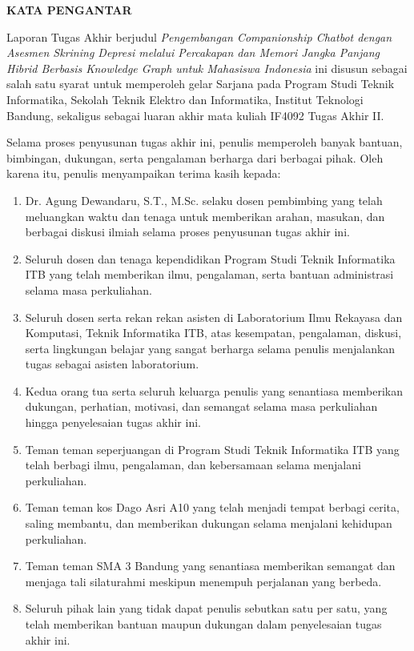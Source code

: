 \begin{center}
{\bfseries\large KATA PENGANTAR}
\end{center}

\vspace{0.5cm}

Laporan Tugas Akhir berjudul \textit{Pengembangan Companionship Chatbot dengan Asesmen Skrining Depresi melalui Percakapan dan Memori Jangka Panjang Hibrid Berbasis Knowledge Graph untuk Mahasiswa Indonesia} ini disusun sebagai salah satu syarat untuk memperoleh gelar Sarjana pada Program Studi Teknik Informatika, Sekolah Teknik Elektro dan Informatika, Institut Teknologi Bandung, sekaligus sebagai luaran akhir mata kuliah IF4092 Tugas Akhir II.

Selama proses penyusunan tugas akhir ini, penulis memperoleh banyak bantuan, bimbingan, dukungan, serta pengalaman berharga dari berbagai pihak. Oleh karena itu, penulis menyampaikan terima kasih kepada:

\begin{enumerate}[label=\arabic*.,leftmargin=*]

\item Dr. Agung Dewandaru, S.T., M.Sc. selaku dosen pembimbing yang telah meluangkan waktu dan tenaga untuk memberikan arahan, masukan, dan berbagai diskusi ilmiah selama proses penyusunan tugas akhir ini.

\item Seluruh dosen dan tenaga kependidikan Program Studi Teknik Informatika ITB yang telah memberikan ilmu, pengalaman, serta bantuan administrasi selama masa perkuliahan.

\item Seluruh dosen serta rekan rekan asisten di Laboratorium Ilmu Rekayasa dan Komputasi, Teknik Informatika ITB, atas kesempatan, pengalaman, diskusi, serta lingkungan belajar yang sangat berharga selama penulis menjalankan tugas sebagai asisten laboratorium.

\item Kedua orang tua serta seluruh keluarga penulis yang senantiasa memberikan dukungan, perhatian, motivasi, dan semangat selama masa perkuliahan hingga penyelesaian tugas akhir ini.

\item Teman teman seperjuangan di Program Studi Teknik Informatika ITB yang telah berbagi ilmu, pengalaman, dan kebersamaan selama menjalani perkuliahan.

\item Teman teman kos Dago Asri A10 yang telah menjadi tempat berbagi cerita, saling membantu, dan memberikan dukungan selama menjalani kehidupan perkuliahan.

\item Teman teman SMA 3 Bandung yang senantiasa memberikan semangat dan menjaga tali silaturahmi meskipun menempuh perjalanan yang berbeda.

\item Seluruh pihak lain yang tidak dapat penulis sebutkan satu per satu, yang telah memberikan bantuan maupun dukungan dalam penyelesaian tugas akhir ini.

\end{enumerate}


